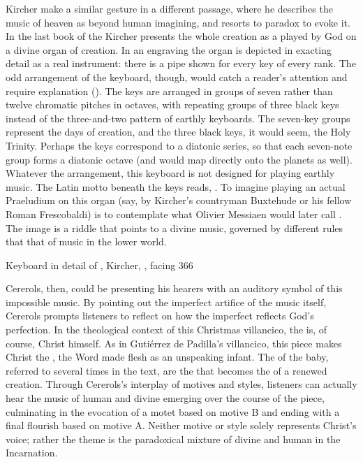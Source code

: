 Kircher make a similar gesture in a different passage, where he describes the
music of heaven as beyond human imagining, and resorts to paradox to evoke it.
In the last book of the  Kircher presents the whole creation as
a  played by God on a divine organ of creation.%
    \Autocite[177]{Godwin:KircherTheater}
In an engraving the organ is depicted in exacting detail as a real instrument:
there is a pipe shown for every key of every rank.%
    \Autocite[, facing 366]{Kircher:Musurgia}
The odd arrangement of the keyboard, though, would catch a reader's attention
and require explanation ().
The keys are arranged in groups of seven rather than twelve chromatic pitches in
octaves, with repeating groups of three black keys instead of the three-and-two
pattern of earthly keyboards. 
The seven-key groups represent the days of creation, and the three black keys,
it would seem, the Holy Trinity. 
Perhaps the keys correspond to a diatonic series, so that each seven-note group
forms a diatonic octave (and would map directly onto the planets as well).
Whatever the arrangement, this keyboard is not designed for playing earthly
music.
The Latin motto beneath the keys reads, .
To imagine playing an actual Praeludium on this organ (say, by Kircher's
countryman Buxtehude or his fellow Roman Frescobaldi) is to contemplate what
Olivier Messiaen would later call .%
    \Autocite{Messiaen:Technique}
The image is a riddle that points to a divine music, governed by different rules
that that of music in the lower world.

{Keyboard in detail of , Kircher, , facing 366}

Cererols, then, could be presenting his hearers with an auditory symbol of this
impossible music.
By pointing out the imperfect artifice of the music itself, Cererols prompts
listeners to reflect on how the imperfect reflects God's perfection.
In the theological context of this Christmas villancico, the  is, of course, Christ himself.
As in Gutiérrez de Padilla's villancico, this piece makes Christ the
, the Word made flesh as an unspeaking infant.
The  of the baby, referred to several times in the text, are the
 that becomes the  of a renewed creation.
Through Cererols's interplay of motives and styles, listeners can actually hear
the music of human and divine emerging over the course of the piece,
culminating in the evocation of a motet based on motive B and ending with a
final flourish based on motive A.
Neither motive or style solely represents Christ's voice; rather the theme is
the paradoxical mixture of divine and human in the Incarnation.


